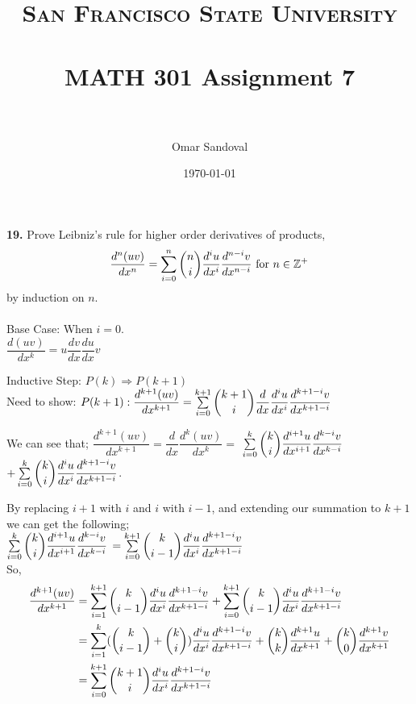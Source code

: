 \documentclass[paper=letter, fontsize=11pt]{scrartcl} %
\title{	
\normalfont \normalsize 
\textsc{San Francisco State University} \\ [25pt]
\horrule{0.5pt} \\[0.4cm] %
\huge MATH 301 Assignment 7  \\ %
\horrule{2pt} \\[0.5cm] %
}
\author{Omar Sandoval}
\date{\normalsize\today}
\begin{document}
\maketitle

\textbf{19.} Prove Leibniz's rule for higher order derivatives of products,
\begin{align*}
    \dfrac{d^n(uv)}{dx^n} = \sum_{i=0}^{n} \dbinom{n}{i} \dfrac{d^iu}{dx^i} \dfrac{d^{n-
    i}v}{dx^{n-i}} \text{ for } n \in \mathbb{Z}^{+}
\end{align*}
by induction on $n$. \\
\\

Base Case: When $i = 0$. \\

$\dfrac{d(uv)}{dx^k} = u \dfrac{dv}{dx} \dfrac{du}{dx}v$

Inductive Step: $P(k) \Rightarrow P(k+1)$ \\ 
Need to show: $P(k+1): \dfrac{d^{k+1}(uv)}{dx^{k+1}} = \sum\limits_{i=0}^{k+1} \dbinom{k+1}{i}
\dfrac{d}{dx}\dfrac{d^iu}{dx^i}\dfrac{d^{k+1-i}v}{dx^{k+1-i}}$

We can see that; $\dfrac{d^{k+1}(uv)}{dx^{k+1}} = \dfrac{d}{dx} \dfrac{d^k(uv)}{dx^k} =$
$\sum\limits_{i=0}^{k}\dbinom{k}{i} \dfrac{d^{i+1}u}{dx^{i+1}}\dfrac{d^{k-i}v}{dx^{k-i}}$
$+ \sum\limits_{i=0}^{k}\dbinom{k}{i} \dfrac{d^iu}{dx^i}\dfrac{d^{k+1-i}v}{dx^{k+1-i}}$.

By replacing $i + 1$ with $i$ and $i$ with $i-1$, and extending our summation to $k+1$ we can get the following; \\


$\sum\limits_{i=0}^{k}\dbinom{k}{i} \dfrac{d^{i+1}u}{dx^{i+1}}\dfrac{d^{k-i}v}{dx^{k-i}}$
$ = \sum\limits_{i=0}^{k+1}\dbinom{k}{i-1} \dfrac{d^{i}u}{dx^{i}}\dfrac{d^{k+1-i}v}{dx^{k+1-i}}$ \\

So,
\begin{align*}
    \dfrac{d^{k+1}(uv)}{dx^{k+1}} &= \sum_{i=1}^{k+1}\dbinom{k}{i-1} \dfrac{d^{i}u}
    {dx^{i}}\dfrac{d^{k+1-i}v}{dx^{k+1-i}} + \sum\limits_{i=0}^{k+1}\dbinom{k}{i-1}
    \dfrac{d^{i}u}{dx^{i}}\dfrac{d^{k+1-i}v}{dx^{k+1-i}} \\
    &= \sum_{i=1}^{k}(\dbinom{k}{i-1}+\dbinom{k}{i})\dfrac{d^iu}{dx^i}\dfrac{d^{k+1-i}v}
    {dx^{k+1-i}} + \dbinom{k}{k}\dfrac{d^{k+1}u}{dx^{k+1}} + \dbinom{k}{0}\dfrac{d^{k+1}v}{dx^{k+1}} \\
    &= \sum_{i=0}^{k+1}\dbinom{k+1}{i}\dfrac{d^iu}{dx^i}\dfrac{d^{k+1-i}v}{dx^{k+1-i}}
\end{align*}
\end{document}

